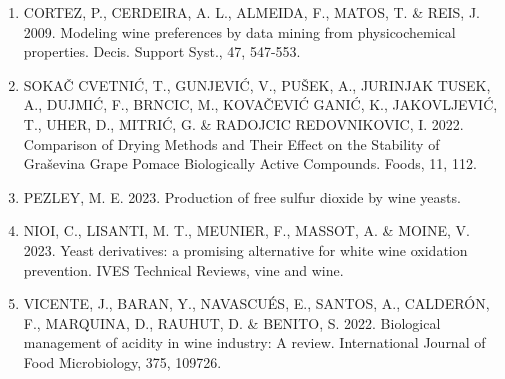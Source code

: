 \documentclass[
]{article}
\providecommand{\tightlist}{%
  \setlength{\itemsep}{0pt}\setlength{\parskip}{0pt}}
\begin{document}
\begin{enumerate}
\def\labelenumi{\arabic{enumi}.}
\tightlist
\item
  CORTEZ, P., CERDEIRA, A. L., ALMEIDA, F., MATOS, T. \& REIS, J. 2009.
  Modeling wine preferences by data mining from physicochemical
  properties. Decis. Support Syst., 47, 547-553.
\item
  SOKAČ CVETNIĆ, T., GUNJEVIĆ, V., PUŠEK, A., JURINJAK TUSEK, A.,
  DUJMIĆ, F., BRNCIC, M., KOVAČEVIĆ GANIĆ, K., JAKOVLJEVIĆ, T., UHER,
  D., MITRIĆ, G. \& RADOJCIC REDOVNIKOVIC, I. 2022. Comparison of Drying
  Methods and Their Effect on the Stability of Graševina Grape Pomace
  Biologically Active Compounds. Foods, 11, 112.
\item
  PEZLEY, M. E. 2023. Production of free sulfur dioxide by wine yeasts.
\item
  NIOI, C., LISANTI, M. T., MEUNIER, F., MASSOT, A. \& MOINE, V. 2023.
  Yeast derivatives: a promising alternative for white wine oxidation
  prevention. IVES Technical Reviews, vine and wine.
\item
  VICENTE, J., BARAN, Y., NAVASCUÉS, E., SANTOS, A., CALDERÓN, F.,
  MARQUINA, D., RAUHUT, D. \& BENITO, S. 2022. Biological management of
  acidity in wine industry: A review. International Journal of Food
  Microbiology, 375, 109726.
\end{enumerate}

\printbibliography
\end{document}
